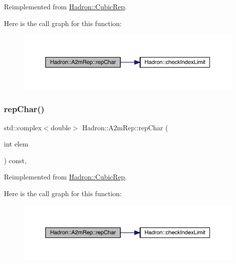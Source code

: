 Reimplemented from \mbox{\hyperlink{structHadron_1_1CubicRep_af45227106e8e715e84b0af69cd3b36f8}{Hadron\+::\+Cubic\+Rep}}.

Here is the call graph for this function\+:
\nopagebreak
\begin{figure}[H]
\begin{center}
\leavevmode
\includegraphics[width=350pt]{da/db3/structHadron_1_1A2mRep_a67d04149198c33ca703b1eb5fc0198f8_cgraph}
\end{center}
\end{figure}
\mbox{\label{structHadron_1_1A2mRep_a67d04149198c33ca703b1eb5fc0198f8}} 
\subsubsection{\texorpdfstring{repChar()}{repChar()}\hspace{0.1cm}{\footnotesize\ttfamily [3/3]}}
{\footnotesize\ttfamily std\+::complex$<$double$>$ Hadron\+::\+A2m\+Rep\+::rep\+Char (\begin{DoxyParamCaption}\item[{int}]{elem }\end{DoxyParamCaption}) const\hspace{0.3cm}{\ttfamily [inline]}, {\ttfamily [virtual]}}



Reimplemented from \mbox{\hyperlink{structHadron_1_1CubicRep_af45227106e8e715e84b0af69cd3b36f8}{Hadron\+::\+Cubic\+Rep}}.

Here is the call graph for this function\+:
\nopagebreak
\begin{figure}[H]
\begin{center}
\leavevmode
\includegraphics[width=350pt]{da/db3/structHadron_1_1A2mRep_a67d04149198c33ca703b1eb5fc0198f8_cgraph}
\end{center}
\end{figure}
\mbox{\label{structHadron_1_1A2mRep_a02575a23902366eafe355b1c36667754}} 
